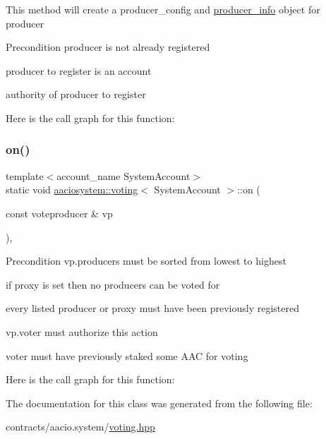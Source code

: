 This method will create a producer\+\_\+config and \mbox{\hyperlink{structaaciosystem_1_1voting_1_1producer__info}{producer\+\_\+info}} object for \textquotesingle{}producer\textquotesingle{}

\begin{DoxyPrecond}{Precondition}
producer is not already registered 

producer to register is an account 

authority of producer to register 
\end{DoxyPrecond}
Here is the call graph for this function\+:
\mbox{\label{classaaciosystem_1_1voting_a58de0ff458be70709e59cd781401dc42}} 
\subsubsection{\texorpdfstring{on()}{on()}\hspace{0.1cm}{\footnotesize\ttfamily [2/2]}}
{\footnotesize\ttfamily template$<$account\+\_\+name System\+Account$>$ \\
static void \mbox{\hyperlink{classaaciosystem_1_1voting}{aaciosystem\+::voting}}$<$ System\+Account $>$\+::on (\begin{DoxyParamCaption}\item[{const voteproducer \&}]{vp }\end{DoxyParamCaption})\hspace{0.3cm}{\ttfamily [inline]}, {\ttfamily [static]}}

\begin{DoxyPrecond}{Precondition}
vp.\+producers must be sorted from lowest to highest 

if proxy is set then no producers can be voted for 

every listed producer or proxy must have been previously registered 

vp.\+voter must authorize this action 

voter must have previously staked some A\+AC for voting 
\end{DoxyPrecond}
Here is the call graph for this function\+:


The documentation for this class was generated from the following file\+:\begin{DoxyCompactItemize}
\item 
contracts/aacio.\+system/\mbox{\hyperlink{voting_8hpp}{voting.\+hpp}}\end{DoxyCompactItemize}

